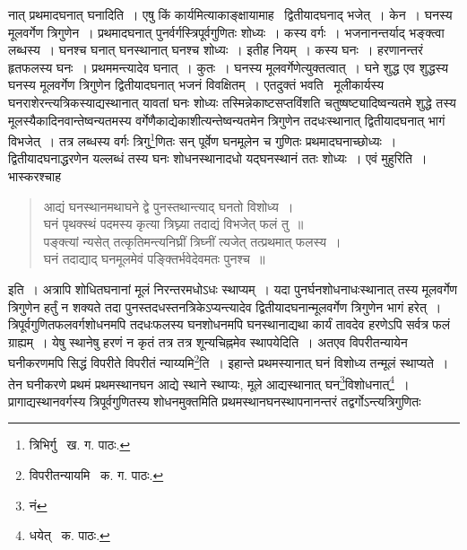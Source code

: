 \documentclass[11pt, openany]{book}
\begin{document}
\newpage

\noindent नात् प्रथमादघनात् घनादिति~। एषु किं कार्यमित्याकाङ्क्षायामाह \textendash\ द्वितीयादघनाद् भजेत्~। केन~। घनस्य मूलवर्गेण त्रिगुणेन~। प्रथमादघनात् पुनर्वर्गस्त्रिपूर्वगुणितः शोध्यः~। कस्य वर्गः~। भजनानन्तर्याद् भङ्क्त्वा लब्धस्य~। घनश्च घनात् घनस्थानात् घनश्च शोध्यः~। इतीह नियम्~। कस्य घनः~। हरणानन्तरं हृतफलस्य घनः~। प्रथममन्त्यादेव घनात्~। कुतः~। घनस्य मूलवर्गेणेत्युक्तत्वात्~। घने शुद्ध एव शुद्धस्य घनस्य मूलवर्गेण त्रिगुणेन द्वितीयादघनात् भजनं विवक्षितम्~। एतदुक्तं भवति \textendash\ मूलीकार्यस्य घनराशेरन्त्यत्रिकस्याद्यस्थानात् यावतां घनः शोध्यः तस्मिन्नेकाष्टसप्तविंशति चतुष्षष्ट्यादिष्वन्यतमे शुद्धे तस्य मूलस्यैकादिनवान्तेष्वन्यतमस्य वर्गेणैकाद्येकाशीत्यन्तेष्वन्यतमेन त्रिगुणेन तदधःस्थानात् द्वितीयादघनात् भागं विभजेत्~। तत्र लब्धस्य वर्गः त्रिगु\renewcommand{\thefootnote}{१}\footnote{त्रिभिर्गु \textendash\ ख. ग. पाठः.}णितः सन् पूर्वेण घनमूलेन च गुणितः प्रथमादघनाच्छोध्यः~। द्वितीयादघनाद्धरणेन यल्लब्धं तस्य घनः शोधनस्थानादधो यद्घनस्थानं ततः शोध्यः~। एवं मुहुरिति~। भास्करश्चाह\textendash 

\begin{quote}
{\qt आद्यं घनस्थानमथाघने द्वे पुनस्तथान्त्याद् घनतो विशोध्य~।\\
घनं पृथक्स्थं पदमस्य कृत्या त्रिघ्न्या तदाद्यं विभजेत् फलं तु~॥\\
पङ्क्त्यां न्यसेत् तत्कृतिमन्त्यनिघ्रीं त्रिघ्नीं त्यजेत् तत्प्रथमात् फलस्य~।\\
घनं तदाद्याद् घनमूलमेवं पङ्क्तिर्भवेदेवमतः पुनश्च~॥}
\end{quote}

\noindent इति~। अत्रापि शोधितघनानां मूलं निरन्तरमधोऽधः स्थाप्यम्~। यदा पुनर्घनशोधनाधःस्थानात् तस्य मूलवर्गेण त्रिगुणेन हर्तुं न शक्यते तदा पुनस्तदधस्तनत्रिकेऽप्यन्त्यादेव द्वितीयादघनान्मूलवर्गेण त्रिगुणेन भागं हरेत्~। त्रिपूर्वगुणितफलवर्गशोधनमपि तदधःफलस्य घनशोधनमपि घनस्थानाद्यथा कार्यं तावदेव हरणेऽपि सर्वत्र फलं ग्राह्यम्~। येषु स्थानेषु हरणं न कृतं तत्र तत्र शून्यचिह्नमेव स्थापयेदिति~। अतएव विपरीतन्यायेन घनीकरणमपि सिद्धं {\qt विपरीते विपरीतं न्याय्यमि}\renewcommand{\thefootnote}{२}\footnote{विपरीतन्यायमि \textendash\ क. ग. पाठः.}ति~। इहान्ते प्रथमस्यानात् घनं विशोध्य तन्मूलं स्थाप्यते~। तेन घनीकरणे प्रथमं प्रथमस्थानघन आद्ये स्थाने स्थाप्यः, मूले आद्यस्थानात् घन\renewcommand{\thefootnote}{३}\footnote{नं}विशोधनात्\renewcommand{\thefootnote}{४}\footnote{धयेत् \textendash\ क. पाठः.}~। प्रागाद्यस्थानवर्गस्य त्रिपूर्वगुणितस्य शोधनमुक्तमिति प्रथमस्थानघनस्थापनानन्तरं तद्वर्गोऽन्त्यत्रिगुणितः 

\newpage
\end{document}
